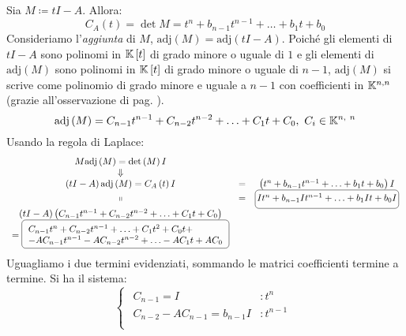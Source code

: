 \begin{demonstration}
	Sia $M\coloneqq tI-A$. Allora:
	\begin{equation*}
		C_A\left(t\right)=\det M=t^n+b_{n-1}t^{n-1}+\ldots+b_1t+b_0
	\end{equation*}
Consideriamo l'\textit{aggiunta} di $M$, $\mathrm{adj}\left(M\right)=\mathrm{adj}\left(tI-A\right)$.
Poiché gli elementi di $tI-A$ sono polinomi in $\mathbb{K}\left[t\right]$ di grado minore o uguale di $1$ e gli elementi di $\mathrm{adj}\left(M\right)$ sono polinomi in $\mathbb{K}\left[t\right]$ di grado minore o uguale di $n-1$, $\mathrm{adj}\left(M\right)$ si scrive come polinomio di grado minore e uguale a $n-1$ con coefficienti in $\mathbb{K}^{n, n}$ (grazie all'osservazione di pag. \pageref{polinomicoeffmatrisci}).
\begin{equation*}
	\mathrm{adj}\left(M\right)=C_{n-1}t^{n-1}+C_{n-2}t^{n-2}+\ldots+C_1t+C_0,\ C_i\in\kamp^{n,\ n}
\end{equation*}
Usando la regola di Laplace:
\begin{equation*}
	\begin{array}{ccc}
		M\mathrm{adj}\left(M\right)=\det\left(M\right)I&&\\
		\Downarrow&&\\
		\left(tI-A\right)\mathrm{adj}\left(M\right)=C_A\left(t\right)I&=&\left(t^n+b_{n-1}t^{n-1}+\ldots+b_1t+b_0\right)I\\
		\shortparallel &=& \ovaled{It^n+b_{n-1}It^{n-1}+\ldots+b_1It+b_0I}\\
		\left(tI-A\right)\left(C_{n-1}t^{n-1}+C_{n-2}t^{n-2}+\ldots+C_1t+C_0\right)&&\\
		={\tikz[baseline=(char.base)]\node[anchor=south west, draw,rectangle, rounded corners, inner sep=2pt, minimum size=7mm,
		text height=6mm](char){$\begin{array}{l}
				{\small C_{n-1}t^n+C_{n-2}t^{n-1}+\ldots+C_1t^2+C_0t+}\\
				{\small-AC_{n-1}t^{n-1}-AC_{n-2}t^{n-2}+\ldots-AC_1t+AC_0}
			\end{array}$} ;}&&
	\end{array}
\end{equation*}
Uguagliamo i due termini evidenziati, sommando le matrici coefficienti termine a termine. Si ha il sistema:
\begin{equation*}
	\begin{cases}
		\begin{array}{ll}
			C_{n-1}=I&\colon t^n\\
			C_{n-2}-AC_{n-1}=b_{n-1}I&\colon t^{n-1}\\

\end{array}
\end{cases}
\end{equation*}
\end{demonstration}

